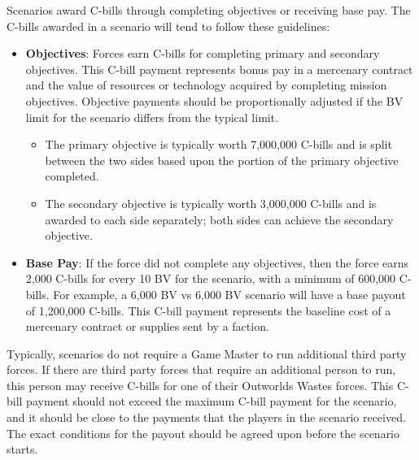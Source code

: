 Scenarios award C-bills through completing objectives or receiving base pay.
The C-bills awarded in a scenario will tend to follow these guidelines:

\begin{itemize}

\item {\bfseries Objectives}: Forces earn C-bills for completing primary and secondary objectives.
This C-bill payment represents bonus pay in a mercenary contract and the value of resources or technology acquired by completing mission objectives.
Objective payments should be proportionally adjusted if the BV limit for the scenario differs from the typical limit.

\begin{itemize}

\item The primary objective is typically worth 7,000,000 C-bills and is split between the two sides based upon the portion of the primary objective completed.

\item The secondary objective is typically worth 3,000,000 C-bills and is awarded to each side separately; both sides can achieve the secondary objective.

\end{itemize}

\item {\bfseries Base Pay}: If the force did not complete any objectives, then the force earns 2,000 C-bills for every 10 BV for the scenario, with a minimum of 600,000 C-bills.
For example, a 6,000 BV vs 6,000 BV scenario will have a base payout of 1,200,000 C-bills.
This C-bill payment represents the baseline cost of a mercenary contract or supplies sent by a faction.

\end{itemize}

Typically, scenarios do not require a Game Master to run additional third party forces.
If there are third party forces that require an additional person to run, this person may receive C-bills for one of their Outworlds Wastes forces.
This C-bill payment should not exceed the maximum C-bill payment for the scenario, and it should be close to the payments that the players in the scenario received.
The exact conditions for the payout should be agreed upon before the scenario starts.
